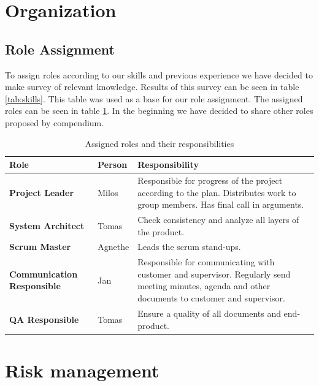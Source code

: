 \documentclass{article}
\newcommand{\ra}[1]{\renewcommand{\arraystretch}{#1}}
\begin{document}
\section{Organization}

\subsection{Role Assignment}
To assign roles according to our skills and previous experience we have decided to make survey of relevant knowledge. 
Results of this survey can be seen in table \ref{tab:skills}. 
This table was used as a base for our role assignment. 
The assigned roles can be seen in table \ref{tab:roles}. 
In the beginning we have decided to share other roles proposed by compendium.

\begin{table}\centering \ra{1.3}
    \caption{Assigned roles and their responsibilities}
    \label{tab:roles}
    \vspace{2mm}
    \begin{tabularx}{\textwidth}{llX}
    \toprule
    Role    & Person   & Responsibility \\
    \midrule
    \textbf{Project Leader}             & Milos &
        Responsible for progress of the project according to the plan.
        Distributes work to group members.
        Has final call in arguments.\\
    \textbf{System Architect}             & Tomas &
        Check consistency and analyze all layers of the product. \\
    \textbf{Scrum Master}             & Agnethe &
        Leads the scrum stand-ups. \\
    \textbf{Communication Responsible}  & Jan &
        Responsible for communicating with customer and supervisor.
        Regularly send meeting minutes, agenda and other documents to customer and supervisor. \\ 
    \textbf{QA Responsible} & Tomas &
        Ensure a quality of all documents and end-product.
        \\ 
    \bottomrule
    \end{tabularx}
\end{table}



\section{Risk management}
\end{document}
